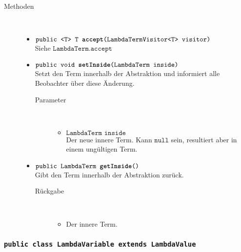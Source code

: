 \begin{description}
\item[Methoden] \hfill \\
	\vspace{-.8cm}
	\begin{itemize}
		\item $\texttt{public <T> T \textbf{accept}(LambdaTermVisitor<T> visitor)}$ \\ Siehe $\texttt{LambdaTerm.accept}$
		
		\item $\texttt{public void \textbf{setInside}(LambdaTerm inside)}$ \\ Setzt den Term innerhalb der Abstraktion und informiert alle Beobachter über diese Änderung.
		\begin{description}
			\item[Parameter] \hfill \\
			\vspace{-.8cm}
			\begin{itemize}
				\item $\texttt{LambdaTerm inside}$ \\ Der neue innere Term. Kann $\texttt{null}$ sein, resultiert aber in einem ungültigen Term.
			\end{itemize}
		\end{description}
		
		\item $\texttt{public LambdaTerm \textbf{getInside}()}$ \\ Gibt den Term innerhalb der Abstraktion zurück.
		\begin{description}
			\item[Rückgabe] \hfill \\
			\vspace{-.8cm}
			\begin{itemize}
				\item Der innere Term.
			\end{itemize}
		\end{description}
	\end{itemize}
\end{description}

\subsubsection{\normalfont \texttt{public class \textbf{LambdaVariable} extends LambdaValue}}

